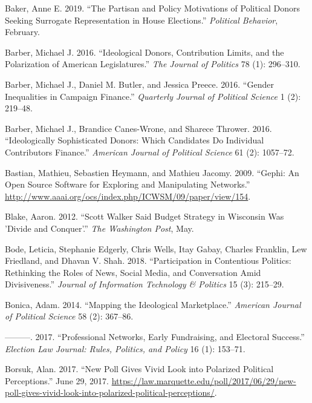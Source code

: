 \documentclass[12pt,]{article}
\begin{document}
\leavevmode\hypertarget{ref-baker2019}{}%
Baker, Anne E. 2019. ``The Partisan and Policy Motivations of Political
Donors Seeking Surrogate Representation in House Elections.''
\emph{Political Behavior}, February.

\leavevmode\hypertarget{ref-barber2016a}{}%
Barber, Michael J. 2016. ``Ideological Donors, Contribution Limits, and
the Polarization of American Legislatures.'' \emph{The Journal of
Politics} 78 (1): 296--310.

\leavevmode\hypertarget{ref-barber2016b}{}%
Barber, Michael J., Daniel M. Butler, and Jessica Preece. 2016. ``Gender
Inequalities in Campaign Finance.'' \emph{Quarterly Journal of Political
Science} 1 (2): 219--48.

\leavevmode\hypertarget{ref-barber2016c}{}%
Barber, Michael J., Brandice Canes-Wrone, and Sharece Thrower. 2016.
``Ideologically Sophisticated Donors: Which Candidates Do Individual
Contributors Finance.'' \emph{American Journal of Political Science} 61
(2): 1057--72.

\leavevmode\hypertarget{ref-gephi}{}%
Bastian, Mathieu, Sebastien Heymann, and Mathieu Jacomy. 2009. ``Gephi:
An Open Source Software for Exploring and Manipulating Networks.''
\url{http://www.aaai.org/ocs/index.php/ICWSM/09/paper/view/154}.

\leavevmode\hypertarget{ref-blake2012}{}%
Blake, Aaron. 2012. ``Scott Walker Said Budget Strategy in Wisconsin Was
'Divide and Conquer'.'' \emph{The Washington Post}, May.

\leavevmode\hypertarget{ref-bode2018}{}%
Bode, Leticia, Stephanie Edgerly, Chris Wells, Itay Gabay, Charles
Franklin, Lew Friedland, and Dhavan V. Shah. 2018. ``Participation in
Contentious Politics: Rethinking the Roles of News, Social Media, and
Conversation Amid Divisiveness.'' \emph{Journal of Information
Technology \& Politics} 15 (3): 215--29.

\leavevmode\hypertarget{ref-bonica2014}{}%
Bonica, Adam. 2014. ``Mapping the Ideological Marketplace.''
\emph{American Journal of Political Science} 58 (2): 367--86.

\leavevmode\hypertarget{ref-bonica2017}{}%
---------. 2017. ``Professional Networks, Early Fundraising, and
Electoral Success.'' \emph{Election Law Journal: Rules, Politics, and
Policy} 16 (1): 153--71.

\leavevmode\hypertarget{ref-borsuk2017}{}%
Borsuk, Alan. 2017. ``New Poll Gives Vivid Look into Polarized Political
Perceptions.'' June 29, 2017.
\url{https://law.marquette.edu/poll/2017/06/29/new-poll-gives-vivid-look-into-polarized-political-perceptions/}.
\end{document}
